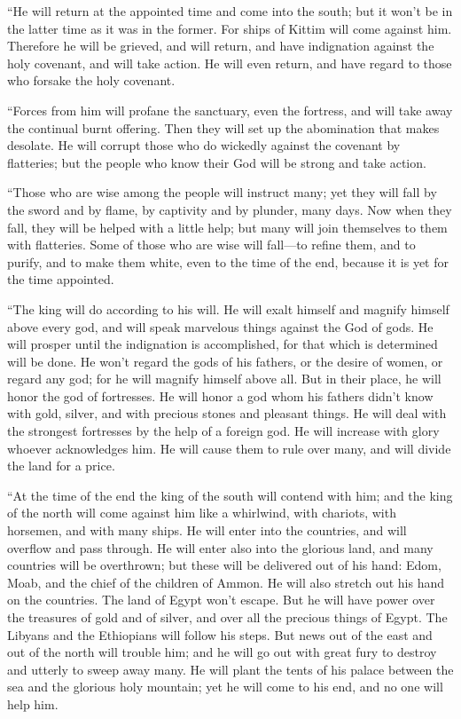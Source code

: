  ``He will return at the appointed time and come into the
south; but it won't be in the latter time as it was in the former.
 For ships of Kittim will come against him. Therefore he
will be grieved, and will return, and have indignation against the holy
covenant, and will take action. He will even return, and have regard to
those who forsake the holy covenant.

 ``Forces from him will profane the sanctuary, even the
fortress, and will take away the continual burnt offering. Then they
will set up the abomination that makes desolate.  He will
corrupt those who do wickedly against the covenant by flatteries; but
the people who know their God will be strong and take action.

 ``Those who are wise among the people will instruct
many; yet they will fall by the sword and by flame, by captivity and by
plunder, many days.  Now when they fall, they will be
helped with a little help; but many will join themselves to them with
flatteries.  Some of those who are wise will fall---to
refine them, and to purify, and to make them white, even to the time of
the end, because it is yet for the time appointed.

 ``The king will do according to his will. He will exalt
himself and magnify himself above every god, and will speak marvelous
things against the God of gods. He will prosper until the indignation is
accomplished, for that which is determined will be done. 
He won't regard the gods of his fathers, or the desire of women, or
regard any god; for he will magnify himself above all. 
But in their place, he will honor the god of fortresses. He will honor a
god whom his fathers didn't know with gold, silver, and with precious
stones and pleasant things.  He will deal with the
strongest fortresses by the help of a foreign god. He will increase with
glory whoever acknowledges him. He will cause them to rule over many,
and will divide the land for a price.

 ``At the time of the end the king of the south will
contend with him; and the king of the north will come against him like a
whirlwind, with chariots, with horsemen, and with many ships. He will
enter into the countries, and will overflow and pass through.
 He will enter also into the glorious land, and many
countries will be overthrown; but these will be delivered out of his
hand: Edom, Moab, and the chief of the children of Ammon.
 He will also stretch out his hand on the countries. The
land of Egypt won't escape.  But he will have power over
the treasures of gold and of silver, and over all the precious things of
Egypt. The Libyans and the Ethiopians will follow his steps.
 But news out of the east and out of the north will
trouble him; and he will go out with great fury to destroy and utterly
to sweep away many.  He will plant the tents of his
palace between the sea and the glorious holy mountain; yet he will come
to his end, and no one will help him.

